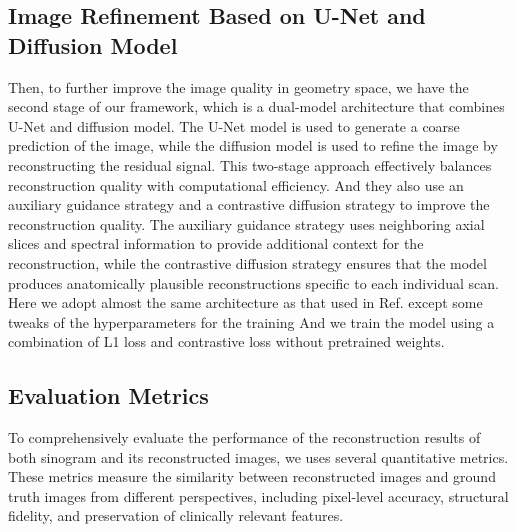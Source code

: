 \documentclass[12pt]{iopart}
\begin{document}
\subsection{Image Refinement Based on U-Net and Diffusion Model}
\label{sec:diffusion_model}
Then, to further improve the image quality in geometry space, we have the second stage of our framework, which is a dual-model architecture that combines U-Net and diffusion model. The U-Net model is used to generate a coarse prediction of the image, while the diffusion model is used to refine the image by reconstructing the residual signal. This two-stage approach effectively balances reconstruction quality with computational efficiency.
And they also use an auxiliary guidance strategy and a contrastive diffusion strategy to improve the reconstruction quality. The auxiliary guidance strategy uses neighboring axial slices and spectral information to provide additional context for the reconstruction, while the contrastive diffusion strategy ensures that the model produces anatomically plausible reconstructions specific to each individual scan. 
Here we adopt almost the same architecture as that used in Ref. \cite{han2023} except some tweaks of the hyperparameters for the training
And we train the model using a combination of L1 loss and contrastive loss without pretrained weights. 

\subsection{Evaluation Metrics}

To comprehensively evaluate the performance of the reconstruction results of both sinogram and its reconstructed images, we uses several quantitative metrics. These metrics measure the similarity between reconstructed images and ground truth images from different perspectives, including pixel-level accuracy, structural fidelity, and preservation of clinically relevant features.

\end{document}
